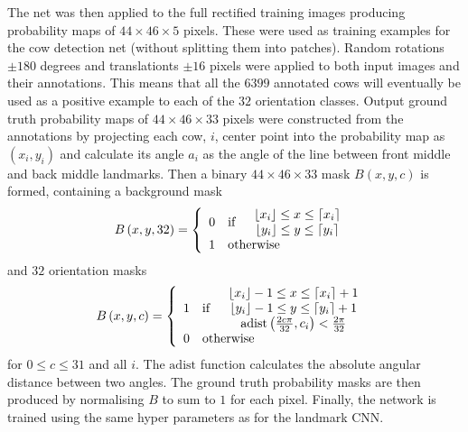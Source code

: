\documentclass{cta-author}
\begin{document}
 The net was then applied to the full rectified training images producing probability maps of $44\times 46\times 5$ pixels. These were used as training examples for the cow detection net (without splitting them into patches). Random rotations $\pm 180$ degrees and translationts $\pm 16$ pixels were applied to both input images and their annotations. This means that all the $6399$ annotated cows will eventually be used as a positive example to each of the $32$ orientation classes. Output ground truth probability maps of $44\times 46\times 33$ pixels were constructed from the annotations by projecting each cow, $i$, center point into the probability map as $\left( x_i, y_i \right)$ and calculate its angle $a_i$ as the angle of the line between front middle and back middle landmarks. Then a binary $44\times 46\times 33$ mask $B\left( x, y, c \right)$ is formed, containing a background mask
\begin{equation}
B\left( x, y, 32 \right) = \left\lbrace
\begin{array}{clc}
0 & \text{if} &
\begin{array}{c}
 \lfloor x_i \rfloor \leq x \leq \lceil x_i \rceil \\
 \lfloor y_i \rfloor \leq y \leq \lceil y_i \rceil
\end{array}
\\
1 & \multicolumn{2}{l}{\text{otherwise}}
\end{array}
\right.
\end{equation}
and $32$ orientation masks
\begin{equation}
B\left( x, y, c \right) = \left\lbrace
\begin{array}{clc}
1 & \text{if} &
\begin{array}{c}
 \lfloor x_i \rfloor-1 \leq x \leq \lceil x_i \rceil+1 \\
 \lfloor y_i \rfloor-1 \leq y \leq \lceil y_i \rceil+1 \\
 \mathrm{adist}\left(\frac{2c\pi}{32}, c_i\right) < \frac{2\pi}{32} \\
\end{array}
\\
0 & \multicolumn{2}{l}{\text{otherwise}}
\end{array}
\right.
\end{equation}
for $0\leq c \leq 31$ and all $i$. The $\mathrm{adist}$ function calculates the absolute angular distance between two angles. The ground truth probability masks are then produced by normalising $B$ to sum to $1$ for each pixel. Finally, the network is trained using the same hyper parameters as for the landmark CNN.
\end{document}
